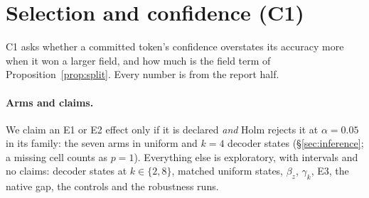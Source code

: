 %

\providecommand{\Cres}[1]{\ifcsname #1\endcsname\csname #1\endcsname\else\textbf{?}\fi}
\providecommand{\CresCI}[1]{\ensuremath{\Cres{#1}\;[\Cres{#1Lo},\,\Cres{#1Hi}]}}
\ifdefined\Cfitbox\else\newsavebox{\Cfitbox}\fi
\providecommand{\Cfit}[1]{\sbox{\Cfitbox}{#1}%
  \ifdim\wd\Cfitbox>\linewidth\resizebox{\linewidth}{!}{\usebox{\Cfitbox}}\else\usebox{\Cfitbox}\fi}
\providecommand{\Cpending}[1]{\fbox{\parbox{0.9\linewidth}{\centering\small #1: pending results
  (\texttt{scripts/c1\_paper\_outputs.py})}}}

\section{Selection and confidence (C1)}
\label{sec:c1}

C1 asks whether a committed token's confidence overstates its accuracy more when it won a
larger field, and how much is the field term of Proposition~\ref{prop:split}. Every
number is from the report half.

\paragraph{Arms and claims.}
We claim an E1 or E2 effect only if it is declared \emph{and} Holm rejects it at $\alpha=0.05$
in its family: the seven arms in uniform and $k{=}4$ decoder states (\S\ref{sec:inference};
a missing cell counts as $p=1$).
Everything else is exploratory, with intervals and no claims: decoder states at
$k\in\{2,8\}$, matched uniform states, $\beta_z$, $\gamma_k$, E3, the native gap, the controls
and the robustness runs.

